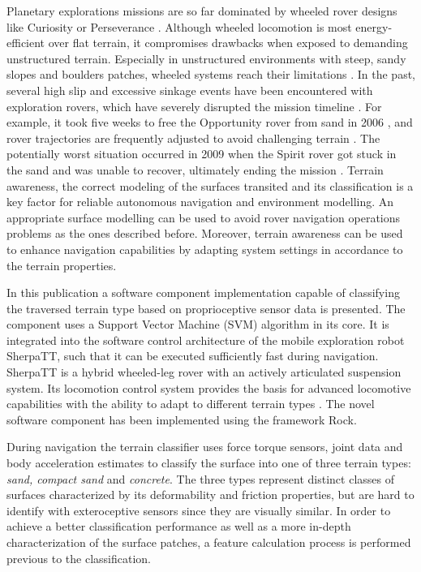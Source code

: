 \documentclass{article}
\begin{document}
Planetary explorations missions are so far dominated by wheeled rover designs like Curiosity
or Perseverance \cite{moeller2021, welch2013}. Although wheeled locomotion is most energy-efficient
over flat terrain, it compromises drawbacks when exposed to demanding unstructured
terrain. Especially in unstructured environments with steep, sandy slopes and boulders
patches, wheeled systems reach their limitations \cite{kolvenbach2021}. In the past, several high slip and
excessive sinkage events have been encountered with exploration rovers, which have severely
disrupted the mission timeline \cite{gonzalez2018}. For example, it took five weeks to free the Opportunity
rover from sand in 2006 \cite{young2006}, and rover trajectories are frequently adjusted to avoid
challenging terrain \cite{arvidson2017}. The potentially worst situation occurred in 2009 when the
Spirit rover got stuck in the sand and was unable to recover, ultimately ending the mission
\cite{webster2009}. 
Terrain awareness, the correct modeling of the surfaces transited and its classification is a key factor for reliable autonomous navigation and environment modelling. 
An appropriate surface modelling can be used to avoid rover navigation operations problems as the ones described before. 
Moreover, terrain awareness can be used to enhance navigation capabilities by adapting system settings in accordance to the terrain properties.

In this publication a software component implementation capable of classifying the traversed terrain type based on proprioceptive sensor data is presented. 
The component uses a Support Vector Machine (SVM) algorithm \cite{vapnik1992,cristianini2000} in its core. It is integrated into the software control architecture of the mobile exploration robot SherpaTT, such that it can be executed sufficiently fast during navigation. SherpaTT is a hybrid wheeled-leg rover with an actively articulated suspension system. Its locomotion control system provides the basis for advanced locomotive capabilities with the ability to adapt to different terrain types \cite{cordes2018}. 
The novel software component has been implemented using the framework Rock.


During navigation the terrain classifier uses force torque sensors, joint data and body acceleration estimates to classify the surface into one of three terrain types: \emph{sand, compact sand} and \emph{concrete}.
The three types represent distinct classes of surfaces characterized by its deformability and friction properties, but are hard to identify with exteroceptive sensors since they are visually similar.
In order to achieve a better classification performance as well as a more in-depth characterization of the surface patches, a feature calculation process is performed previous to the classification. 
\end{document}
